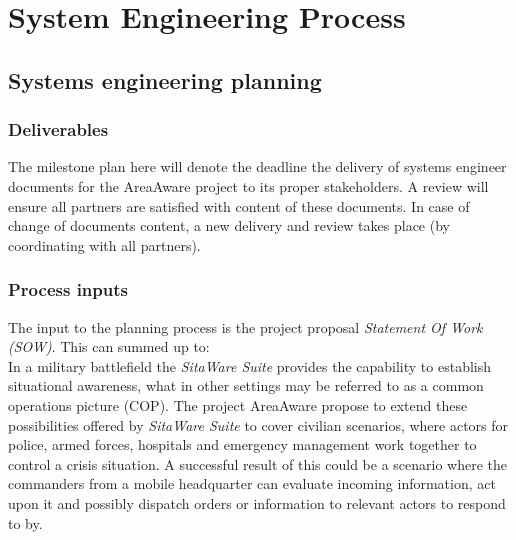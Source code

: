 %
\thispagestyle{fancy}
\chapter{System Engineering Process}
\label{chp:se_process}

\section{Systems engineering planning}

\subsection{Deliverables}
\label{plan:deliverables}
The milestone plan here will denote the deadline the delivery of systems engineer documents for the AreaAware project to its proper stakeholders.
A review will ensure all partners are satisfied with content of these documents.
In case of change of documents content, a new delivery and review takes place (by coordinating with all partners).

\subsection{Process inputs}
The input to the planning process is the project proposal \emph{Statement Of Work (SOW)}.
This can summed up to:\\
In a military battlefield the \emph{SitaWare Suite} provides the capability to establish situational awareness, what in other settings may be referred to as a common operations picture (COP).
The project AreaAware propose to extend these possibilities offered by \emph{SitaWare Suite} to cover civilian scenarios, where actors for police, armed forces, hospitals and emergency management work together to control a crisis situation.
A successful result of this could be a scenario where the commanders from a mobile headquarter can evaluate incoming information, act upon it and possibly dispatch orders or information to relevant actors to respond to by.

